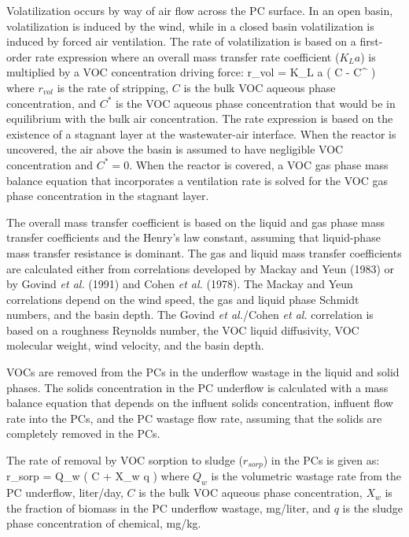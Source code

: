 
Volatilization occurs by way of air flow across the PC surface. In an open
basin, volatilization is induced by the wind, while in a closed basin
volatilization is induced by forced air ventilation.  The rate of
volatilization is based on a first-order rate expression where an overall mass
transfer rate coefficient ($K_L a$) is multiplied by a VOC concentration
driving force:
\mb
r_{vol} = K_L a ( C - C^{\ast} )
\mef
where $r_{vol}$ is the rate of stripping, $C$ is the bulk VOC aqueous phase
concentration, and $C^{\ast}$ is the VOC aqueous phase concentration that would
be in equilibrium with the bulk air concentration.  The rate expression is
based on the existence of a stagnant layer at the wastewater-air interface.
When the reactor is uncovered, the air above the basin is assumed to have
negligible VOC concentration and $C^{\ast} = 0$.  When the reactor is covered,
a VOC gas phase mass balance equation that incorporates a ventilation rate is
solved for the VOC gas phase concentration in the stagnant layer.  

The overall mass transfer coefficient is based on the liquid and gas phase mass
transfer coefficients and the Henry's law constant, assuming that liquid-phase
mass transfer resistance is dominant.  The gas and liquid mass transfer
coefficients are calculated either from correlations developed by Mackay and
Yeun (1983) or by Govind {\it et al.} (1991) and Cohen {\it et al.} (1978).
The Mackay and Yeun correlations depend on the wind speed, the gas and liquid
phase Schmidt numbers, and the basin depth.  The Govind {\it et al.}/Cohen {\it
et al.} correlation is based on a roughness Reynolds number, the VOC liquid
diffusivity, VOC molecular weight, wind velocity, and the basin depth.


VOCs are removed from the PCs in the underflow wastage in the liquid and solid
phases.  The solids concentration in the PC underflow is calculated with a mass
balance equation that depends on the influent solids concentration, influent
flow rate into the PCs, and the PC wastage flow rate, assuming that the solids
are completely removed in the PCs.  

The rate of removal by VOC sorption to sludge ($r_{sorp}$) in the PCs is given
as:
\mb
r_{sorp} = Q_w ( C + X_w q )
\mef
where $Q_w$ is the volumetric wastage rate from the PC underflow,
liter/day, $C$ is the bulk VOC aqueous phase concentration, $X_w$ is
the fraction of biomass in the PC underflow wastage, mg/liter, and $q$
is the sludge phase concentration of chemical, mg/kg.

